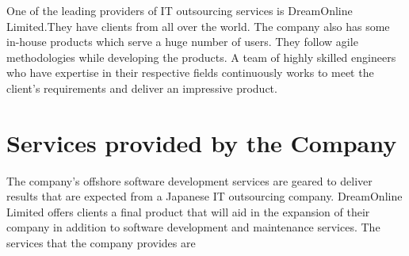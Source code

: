 \setcounter{section}{0} 

One of the leading providers of IT outsourcing services is DreamOnline Limited.They have clients from
all over the world. The company also has some in-house products which serve a huge number
of users. They follow agile methodologies while developing the products. A team of highly
skilled engineers who have expertise in their respective fields continuously works to meet the
client's requirements and deliver an impressive product.
\section{Services provided by the Company}
\begin{flushleft}
The company's offshore software development services are geared to deliver results that are
expected from a Japanese IT outsourcing company. DreamOnline Limited offers clients a final
product that will aid in the expansion of their company in addition to software development and
maintenance services. The services that the company provides are


\end{flushleft}
